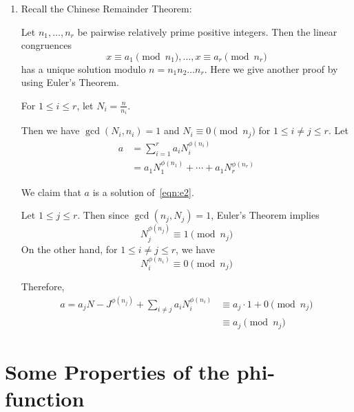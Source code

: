 \begin{eg}
\begin{enumerate}
        \item Recall the Chinese Remainder Theorem:
        
        Let $n_1, \dots, n_r$ be pairwise relatively prime positive integers. 
        Then the linear congruences
        \[
            \tag{*}
            x \equiv a_1 \pmod{n_1}, \dots, x \equiv a_r \pmod{n_r}
            \label{eqn:e2}
        \]
        has a unique solution modulo $n = n_1 n_2 \dots n_r$.
        Here we give another proof by using Euler's Theorem.

        For $1 \leq i \leq r$, let $N_i = \frac{n}{n_i}$. 
        
        Then we have $\gcd(N_i, n_i) = 1$ and 
        $N_i \equiv 0 \pmod{n_j}$ for $1 \leq i \neq j \leq r$.
        Let
        \[
            \begin{aligned}
                a &= \sum_{i=1}^{r}{a_i N_i^{\phi(n_i)}} \\
                &= a_1 N_1^{\phi(n_1)} + \cdots + a_1 N_r^{\phi(n_r)}
            \end{aligned}
        \]

        We claim that $a$ is a solution of~\eqref{eqn:e2}.

        Let $1 \leq j \leq r$. Then since $\gcd(n_j, N_j) = 1$, Euler's Theorem implies
        \[
            N_j^{\phi(n_j)} \equiv 1 \pmod{n_j}
        \]
        On the other hand, for $1 \leq i \neq j \leq r$, we have
        \[
            N_i^{\phi(n_i)} \equiv 0 \pmod{n_j}
        \]

        Therefore,
        \[
            \begin{aligned}
                a = a_j N-J^{\phi(n_j)} + \sum_{i \neq j}^{}{a_i N_i^{\phi(n_i)}} &\equiv a_j \cdot 1 + 0 \pmod{n_j} \\
                &\equiv a_j \pmod n_j
            \end{aligned}
        \]
    \end{enumerate}
\end{eg}

\section{Some Properties of the phi-function}

